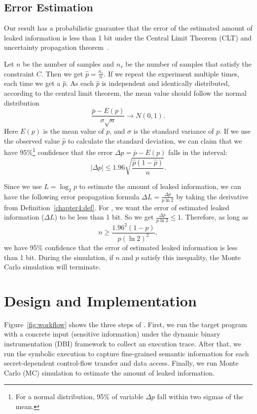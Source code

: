 \subsection{Error Estimation}
\label{sssec:errest}
Our result has a probabilistic guarantee that the error of the estimated amount of leaked
information is less than 1 bit under the Central Limit Theorem (CLT) and uncertainty
propagation theorem~\cite{walpole1993probability}.

Let $n$ be the number of samples and $n_s$ be the number of samples that satisfy
the constraint $C$. Then we get $\hat{p} = \frac{n_s}{n}$. If we repeat the
experiment multiple times, each time we get a $\hat{p}$. As each
$\hat{p}$ is independent and identically distributed, according to the central limit
theorem, the mean value should follow the normal distribution
$$ \frac{\bar{p}-E(p)}{\sigma\sqrt{n}} \rightarrow N(0,1). $$ Here $E(p)$ is the
mean value of $p$, and $\sigma$ is the standard variance of $p$. If we use the
observed value $\hat{p}$ to calculate the standard deviation, we can claim that
we have 95\%\footnote{For a normal distribution, 95\% of variable $\Delta p$ fall within two sigmas of the mean.}
confidence that the error $\Delta p= \bar{p} - E(p)$ falls in the interval:
$$ |\Delta p| \leq 1.96\sqrt{\frac{ \hat{p} (1- \hat{p} )}{n}}.$$

Since we use $L = \log_{2}p$ to estimate the amount of leaked information, we
can have the following error propagation formula $\Delta L = \frac{\Delta
        p}{p\ln2}$ by taking the derivative from Definition~\ref{chapter4:def}. For \tool, we want the error of estimated leaked
information ($\Delta L$) to be less than 1 bit. So we get $\frac{\Delta
        p}{p\ln2} \leq 1$. Therefore, as long as $$ n \geq \frac{1.96^2(1-p)}{p(\ln2)^2},$$ 
\noindent we have 95\% confidence that the error of estimated leaked information is less than 1 bit.
During the simulation, if $n$ and $p$ satisfy this inequality, the Monte Carlo
simulation will terminate.

\section{Design and Implementation}

Figure~\ref{fig:workflow} shows the three steps of \tool{}.
First, we run the target program with a
concrete input (sensitive information) under the dynamic binary instrumentation
(DBI) framework to collect an execution trace. After that, we run the symbolic
execution to capture fine-grained semantic information for each
secret-dependent control-flow transfer and data access. Finally, we run Monte
Carlo (MC) simulation to estimate the amount of leaked information.


